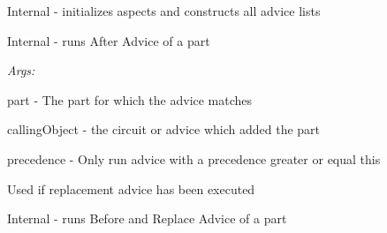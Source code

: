 \documentclass[letterpaper,10pt,english]{sphinxmanual}
\begin{document}
\begin{fulllineitems}
\begin{fulllineitems}
\end{fulllineitems}


\begin{fulllineitems}
\label{modules/index:aosb.core.Weaver.readAspectsConstructAdviceLists}
Internal - initializes aspects and constructs all advice lists

\end{fulllineitems}


\begin{fulllineitems}
\label{modules/index:aosb.core.Weaver.runAfterAdvice}
Internal - runs After Advice of a part

\begin{DUlineblock}{0em}
\item[] \emph{Args:}
\item[]
\begin{DUlineblock}{\DUlineblockindent}
\item[] part - The part for which the advice matches
\item[] callingObject - the circuit or advice which added the part
\item[] precedence - Only run advice with a precedence greater or equal this
\item[]
\begin{DUlineblock}{\DUlineblockindent}
\item[] Used if replacement advice has been executed
\end{DUlineblock}
\end{DUlineblock}
\end{DUlineblock}

\end{fulllineitems}


\begin{fulllineitems}
\label{modules/index:aosb.core.Weaver.runBeforeAndReplaceAdvice}
Internal - runs Before and Replace Advice of a part


\end{fulllineitems}
\end{fulllineitems}
\end{document}
